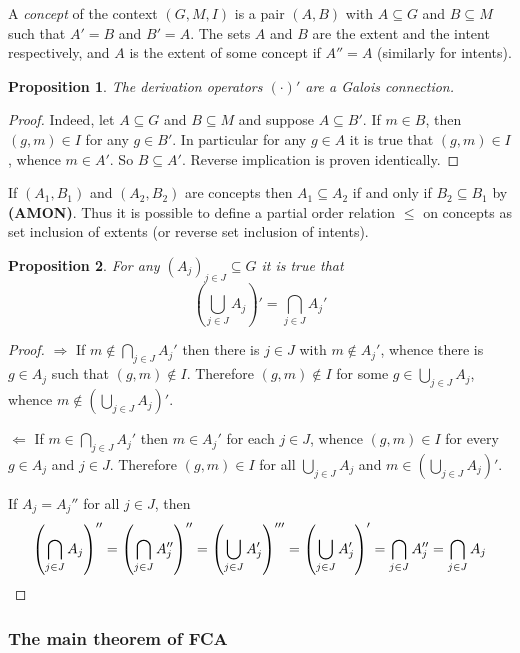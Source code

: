 \documentclass[a4paper]{article}
\newcommand{\brac}[1]{{\left ( #1 \right )}}
\newtheorem{prop}{Proposition}
\begin{document}
A \emph{concept} of the context $(G,M,I)$ is a pair $(A,B)$ with $A\subseteq G$ and $B\subseteq M$ such that $A'=B$ and $B'=A$. The sets $A$ and $B$ are the extent and the intent respectively, and $A$ is the extent of some concept if $A''=A$ (similarly for intents).

\begin{prop} The derivation operators ${(\cdot)}'$ are a Galois connection.
\end{prop}

\begin{proof}
Indeed, let $A\subseteq G$ and $B\subseteq M$ and suppose $A\subseteq B'$. If $m\in B$, then $(g,m)\in I$ for any $g\in B'$. In particular for any $g\in A$ it is true that $(g,m)\in I$, whence $m\in A'$. So $B\subseteq A'$. Reverse implication is proven identically.
\end{proof}

If $(A_1, B_1)$ and $(A_2, B_2)$ are concepts then $A_1\subseteq A_2$ if and only if $B_2\subseteq B_1$ by \textbf{(AMON)}. Thus it is possible to define a partial order relation $\leq$ on concepts as set inclusion of extents (or reverse set inclusion of intents).

\begin{prop} For any $\brac{A_j}_{j\in J}\subseteq G$ it is true that \[\brac{\bigcup_{j\in J}A_j}' = \bigcap_{j\in J} A_j'\]
\end{prop}

\begin{proof}
$\Rightarrow$ If $m\notin \bigcap_{j\in J} A_j'$ then there is $j\in J$ with $m\notin A_j'$, whence there is $g\in A_j$ such that $(g,m)\notin I$. Therefore $(g,m)\notin I$ for some $g\in \bigcup_{j\in J}A_j$, whence $m\notin \brac{\bigcup_{j\in J}A_j}'$.

$\Leftarrow$ If $m\in \bigcap_{j\in J} A_j'$ then $m\in A_j'$ for each $j\in J$, whence $(g,m)\in I$ for every $g\in A_j$ and $j\in J$. Therefore $(g,m)\in I$ for all $\bigcup_{j\in J}A_j$ and $m\in \brac{\bigcup_{j\in J} A_j}'$.

If $A_j=A_j''$ for all $j\in J$, then \[\brac{\bigcap_{j\in J}A_j}'' = \brac{\bigcap_{j\in J}A_j''}'' = \brac{\bigcup_{j\in J}A_j'}''' = \brac{\bigcup_{j\in J}A_j'}' = \bigcap_{j\in J}A_j'' = \bigcap_{j\in J}A_j \qedhere\]
\end{proof}

\subsubsection{The main theorem of FCA} %
\label{ssub:the_main_theorem_of_fca}
\end{document}
